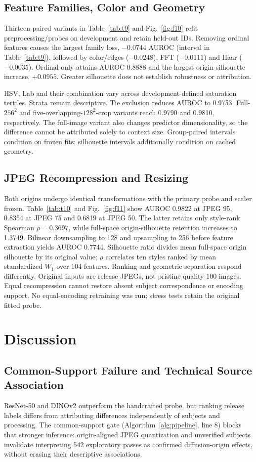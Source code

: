 \documentclass[journal,twoside,web]{IEEEtran}
\begin{document}
\subsection{Feature Families, Color and Geometry}
Thirteen paired variants in Table~\ref{tab:t9} and Fig.~\ref{fig:f10} refit preprocessing/probes on development and retain held-out IDs. Removing ordinal features causes the largest family loss, $-0.0744$ AUROC (interval in Table~\ref{tab:t9}), followed by color/edges ($-0.0248$), FFT ($-0.0111$) and Haar ($-0.0035$). Ordinal-only attains AUROC 0.8888 and the largest origin-silhouette increase, $+0.0955$. Greater silhouette does not establish robustness or attribution.


HSV, Lab and their combination vary across development-defined saturation tertiles. Strata remain descriptive. Tie exclusion reduces AUROC to 0.9753. Full-$256^2$ and five-overlapping-$128^2$-crop variants reach 0.9790 and 0.9810, respectively. The full-image variant also changes predictor dimensionality, so the difference cannot be attributed solely to context size. Group-paired intervals condition on frozen fits; silhouette intervals additionally condition on cached geometry.
\subsection{JPEG Recompression and Resizing}
Both origins undergo identical transformations with the primary probe and scaler frozen. Table~\ref{tab:t10} and Fig.~\ref{fig:f11} show AUROC 0.9822 at JPEG 95, 0.8354 at JPEG 75 and 0.6819 at JPEG 50. The latter retains only style-rank Spearman $\rho=0.3697$, while full-space origin-silhouette retention increases to 1.3749. Bilinear downsampling to 128 and upsampling to 256 before feature extraction yields AUROC 0.7744. Silhouette ratio divides mean full-space origin silhouette by its original value; $\rho$ correlates ten styles ranked by mean standardized $W_1$ over 104 features. Ranking and geometric separation respond differently. Original inputs are release JPEGs, not pristine quality-100 images. Equal recompression cannot restore absent subject correspondence or encoding support. No equal-encoding retraining was run; stress tests retain the original fitted probe.



\section{Discussion}
\subsection{Common-Support Failure and Technical Source Association}
ResNet-50 and DINOv2 outperform the handcrafted probe, but ranking release labels differs from attributing differences independently of subjects and processing. The common-support gate (Algorithm~\ref{alg:pipeline}, line 8) blocks that stronger inference: origin-aligned JPEG quantization and unverified subjects invalidate interpreting 542 exploratory passes as confirmed diffusion-origin effects, without erasing their descriptive associations.
\end{document}
